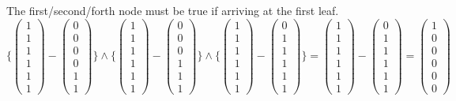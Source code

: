 \documentclass[UTF8]{article}
\begin{document}
The first/second/forth node must be true if arriving at the first leaf.
\begin{equation}
\{\begin{pmatrix}
1\\ 1\\ 1\\ 1\\ 1\\1 \nonumber
\end{pmatrix}-
\begin{pmatrix}
0\\ 0\\ 0\\ 0\\ 1\\1 \nonumber
\end{pmatrix}\}
\wedge
\{\begin{pmatrix}
1\\ 1\\ 1\\ 1\\ 1\\1 \nonumber
\end{pmatrix}-
\begin{pmatrix}
0\\ 0\\ 0\\ 1\\ 1\\1 \nonumber
\end{pmatrix}\}
\wedge
\{\begin{pmatrix}
1\\ 1\\ 1\\ 1\\ 1\\1 \nonumber
\end{pmatrix}-
\begin{pmatrix}
0\\ 1\\ 1\\ 1\\ 1\\1 \nonumber
\end{pmatrix}\}
=
\begin{pmatrix}
1\\ 1\\ 1\\ 1\\ 1\\1 \nonumber
\end{pmatrix}-
\begin{pmatrix}
0\\ 1\\ 1\\ 1\\ 1\\1 \nonumber
\end{pmatrix}
=
\begin{pmatrix}
1\\ 0\\ 0\\ 0\\ 0\\0 \nonumber
\end{pmatrix}
\end{equation}
\end{document}
